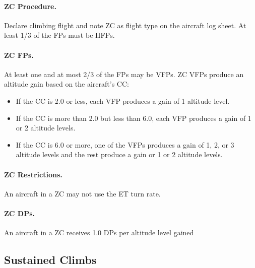 {\paragraph{ZC Procedure.} Declare climbing flight and note ZC as flight type on the aircraft log sheet. At least 1/3 of the FPs must be HFPs. 

\paragraph{ZC FPs.} At least one and at most 2/3 of the FPs may be VFPs. ZC VFPs produce an altitude gain based on the aircraft's CC:
\begin{itemize}
    \item If the CC is 2.0 or less, each VFP produces a gain of 1 altitude level.
    \item If the CC is more than 2.0 but less than 6.0, each VFP produces a gain of 1 or 2 altitude levels.
    \item If the CC is 6.0 or more, one of the VFPs produces a gain of 1, 2, or 3 altitude levels and the rest produce a gain or 1 or 2 altitude levels.
\end{itemize}

\paragraph{ZC Restrictions.} An aircraft in a ZC may not use the ET turn rate.

\paragraph{ZC DPs.} An aircraft in a ZC receives 1.0 DPs per altitude level gained
}


\subsection{Sustained Climbs}
\label{rule:sustained-climbs}

